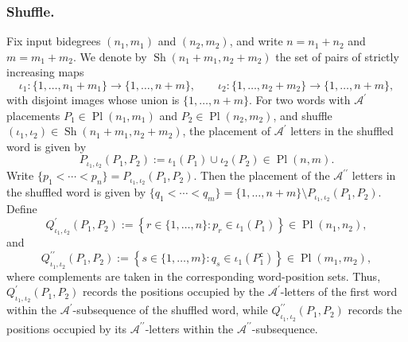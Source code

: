 \documentclass{amsart}
\theoremstyle{definition}
\theoremstyle{remark}
\begin{document}
\subsubsection{Shuffle.}\label{sec:ord_shuffle}
Fix input bidegrees $(n_1,m_1)$ and $(n_2,m_2)$, and write
$n=n_1+n_2$ and $m=m_1+m_2$. We denote by
$\operatorname{Sh}(n_1+m_1,n_2+m_2)$ the set of pairs of strictly
increasing maps
\[
    \iota_1
    \colon
    \{1,\ldots,n_1+m_1\}
    \longrightarrow
    \{1,\ldots,n+m\},
    \qquad
    \iota_2
    \colon
    \{1,\ldots,n_2+m_2\}
    \longrightarrow
    \{1,\ldots,n+m\},
\]
with disjoint images whose union is $\{1,\ldots,n+m\}$.
For two words with $\mathcal{A}^{\prime}$ placements
$P_1\in\operatorname{Pl}(n_1,m_1)$ and
$P_2\in\operatorname{Pl}(n_2,m_2)$, and shuffle
$(\iota_1,\iota_2)\in
\operatorname{Sh}(n_1+m_1,n_2+m_2)$, the  placement of $\mathcal{A}^\prime$ letters in the shuffled word is given by
\[
    P_{\iota_1,\iota_2}(P_1,P_2)
    := \iota_1(P_1)\cup\iota_2(P_2)
    \in
    \operatorname{Pl}(n,m).
\]
Write $\{p_1<\cdots<p_n\} = P_{\iota_1,\iota_2}(P_1,P_2)$. Then the placement of the $\mathcal{A}^{\prime\prime}$ letters in the shuffled word is given by $
    \{q_1<\cdots<q_m\} = \{1, \dots, n+m\}\setminus P_{\iota_1,\iota_2}(P_1,P_2)$.
Define
\[
    Q^{\prime}_{\iota_1,\iota_2}(P_1,P_2)
    :=
    \left\{
        r\in\{1,\ldots,n\}:
        p_r\in\iota_1(P_1)
    \right\}
    \in\operatorname{Pl}(n_1,n_2),
\]
and
\[
    Q^{\prime\prime}_{\iota_1,\iota_2}(P_1,P_2)
    :=
    \left\{
        s\in\{1,\ldots,m\}:
        q_s\in\iota_1(P_1^{\mathsf c})
    \right\}
    \in\operatorname{Pl}(m_1,m_2),
\]
where complements are taken in the corresponding word-position sets.
Thus,
$Q^{\prime}_{\iota_1,\iota_2}(P_1,P_2)$ records the positions occupied
by the $\mathcal{A}^{\prime}$-letters of the first word within the
$\mathcal{A}^{\prime}$-subsequence of the shuffled word, while
$Q^{\prime\prime}_{\iota_1,\iota_2}(P_1,P_2)$ records the positions
occupied by its $\mathcal{A}^{\prime\prime}$-letters within the
$\mathcal{A}^{\prime\prime}$-subsequence.
\end{document}
